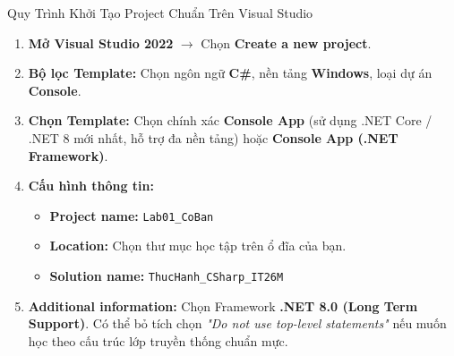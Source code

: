 \documentclass[aspectratio=169, 10pt]{beamer}
\begin{document}
\begin{frame}{Quy Trình Khởi Tạo Project Chuẩn Trên Visual Studio}
  \begin{enumerate}
    \item \textbf{Mở Visual Studio 2022} $\to$ Chọn \textbf{Create a new project}.
    \item \textbf{Bộ lọc Template:} Chọn ngôn ngữ \textbf{C\#}, nền tảng \textbf{Windows}, loại dự án \textbf{Console}.
    \item \textbf{Chọn Template:} Chọn chính xác \textbf{Console App} (sử dụng .NET Core / .NET 8 mới nhất, hỗ trợ đa nền tảng) hoặc \textbf{Console App (.NET Framework)}.
    \item \textbf{Cấu hình thông tin:}
      \begin{itemize}
        \item \textbf{Project name:} \texttt{Lab01\_CoBan}
        \item \textbf{Location:} Chọn thư mục học tập trên ổ đĩa của bạn.
        \item \textbf{Solution name:} \texttt{ThucHanh\_CSharp\_IT26M}
      \end{itemize}
    \item \textbf{Additional information:} Chọn Framework \textbf{.NET 8.0 (Long Term Support)}. Có thể bỏ tích chọn \textit{"Do not use top-level statements"} nếu muốn học theo cấu trúc lớp truyền thống chuẩn mực.
  \end{enumerate}
\end{frame}
\end{document}
